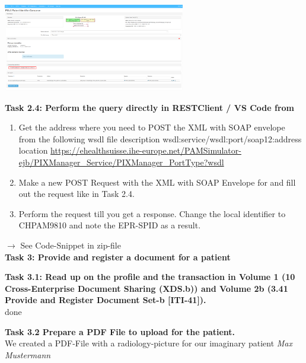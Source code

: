 \documentclass{report}
\newenvironment{Figure}
	{\par\medskip\noindent\minipage{\linewidth}}
	{\endminipage\par\medskip}
\begin{document}
\begin{Figure}
   \centering
    \includegraphics[width=300px]{img/Task23.png}
        \label{fig:Result Task 2.3}
    \end{Figure}

\textbf{Task 2.4: Perform the query directly in RESTClient / VS Code from}
\begin{enumerate}
   \item Get the address where you need to POST the XML with SOAP envelope from the following wsdl file description wsdl:service/wsdl:port/soap12:address location \url{https://ehealthsuisse.ihe-europe.net/PAMSimulator-ejb/PIXManager_Service/PIXManager_PortType?wsdl}
   \item Make a new POST Request with the XML with SOAP Envelope for and fill out the request like in Task 2.4.
   \item Perform the request till you get a response. Change the local identifier to CHPAM9810 and note the EPR-SPID as a result.
\end{enumerate}

$\rightarrow$ See Code-Snippet in zip-file\\

\textbf{Task 3: Provide and register a document for a patient}

\textbf{Task 3.1: Read up on the profile and the transaction in Volume 1 (10 Cross-Enterprise Document Sharing (XDS.b)) and Volume 2b (3.41 Provide and Register Document Set-b [ITI-41]).}\\
done

\textbf{Task 3.2 Prepare a PDF File to upload for the patient.}\\
We created a PDF-File with a radiology-picture for our imaginary patient \textit{Max Mustermann}
\end{document}
